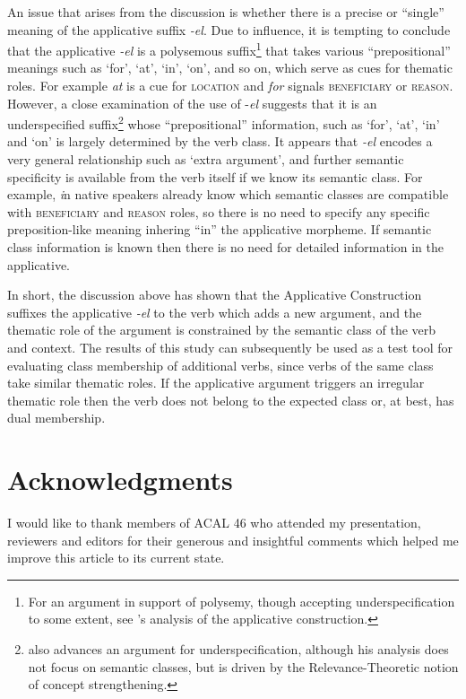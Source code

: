 \documentclass[output=paper]{langsci/langscibook}
\begin{document}
 An issue that arises from the discussion is whether there is a precise or “single” meaning of the applicative suffix \textit{-el}. Due to  influence, it is tempting to conclude that the applicative \textit{-el} is a polysemous suffix\footnote{For an argument in support of polysemy, though accepting underspecification to some extent, see ’s analysis of the  applicative construction.} that takes various “prepositional” meanings such as ‘for’, ‘at’, ‘in’, ‘on’, and so on, which serve as cues for thematic roles. For example  \textit{at} is a cue for \textsc{location} and \textit{for} signals \textsc{beneficiary} or \textsc{reason}. However, a close examination of the use of -\textit{el} suggests that it is an underspecified suffix\footnote{\citet{Marten2002} also advances an argument for underspecification, although his analysis does not focus on semantic classes, but is driven by the Relevance-Theoretic notion of concept strengthening.} whose “prepositional” information, such as ‘for’, ‘at’, ‘in’ and ‘on’ is largely determined by the verb class. It appears that \textit{-el} encodes a very general relationship such as ‘extra argument’, and further semantic specificity is available from the verb itself if we know its semantic class. For example, \textit{i}n  native speakers already know which semantic classes are compatible with \textsc{beneficiary} and \textsc{reason} roles, so there is no need to specify any specific preposition-like meaning inhering “in” the applicative morpheme. If semantic class information is known then there is no need for detailed information in the applicative. 

 In short, the discussion above has shown that the  Applicative Construction suffixes the applicative \textit{-el} to the verb which adds a new argument, and the thematic role of the argument is constrained by the semantic class of the verb and context. The results of this study can subsequently be used as a test tool for evaluating class membership of additional verbs, since verbs of the same class take similar thematic roles. If the applicative argument triggers an irregular thematic role then the verb does not belong to the expected class or, at best, has dual membership.

\section*{Acknowledgments}

I would like to thank members of ACAL 46 who attended my presentation, reviewers and editors for their generous and insightful comments which helped me improve this article to its current state.
\end{document}
